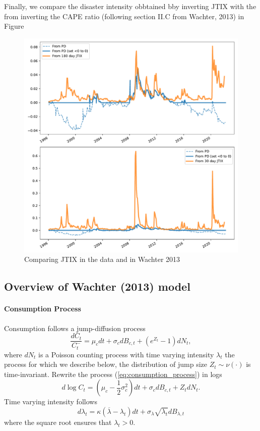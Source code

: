 \documentclass[11pt]{article}
\begin{document}
Finally, we compare the disaster intensity obbtained bby inverting JTIX with the from inverting the CAPE ratio (following section II.C from Wachter, 2013) in Figure 

\begin{figure}[htbp!]
    \includegraphics[width=\textwidth]{../../SS_figures/intensity_from_JTIX_vs_PD.pdf}
    \caption{Comparing JTIX in the data and in Wachter 2013}
    \label{fig:intensity_from_JTIX_vs_PD}
\end{figure}


\subsection{Overview of Wachter (2013) model}

\paragraph{Consumption Process} 

Consumption follows a jump-diffusion process
\begin{equation}\label{eq:consumption_process}
    \frac{dC_t}{C_t^{-}} = \mu_c dt + \sigma_c dB_{c,t} + (e^{Z_t} - 1)dN_t,
\end{equation}
where $dN_t$ is a Poisson counting process with time varying intensity $\lambda_t$
the process for which we describe below, the distribution of jump size
$Z_t \sim \nu(\cdot)$ is time-invariant. Rewrite the process (\ref{eq:consumption_process}) in logs
\begin{equation}\label{eq:consumption_process_logs}
    d\log C_t = \left(\mu_c - \frac{1}{2}\sigma_c^2\right)dt + \sigma_c dB_{c,t} + Z_t dN_t.    
\end{equation}
Time varying intensity follows
\begin{equation}\label{eq:intensity_process}
    d\lambda_t = \kappa (\overline{\lambda} - \lambda_t)dt + \sigma_\lambda \sqrt{\lambda_t}dB_{\lambda, t}
\end{equation}
where the square root ensures that $\lambda_t > 0$.
\end{document}
